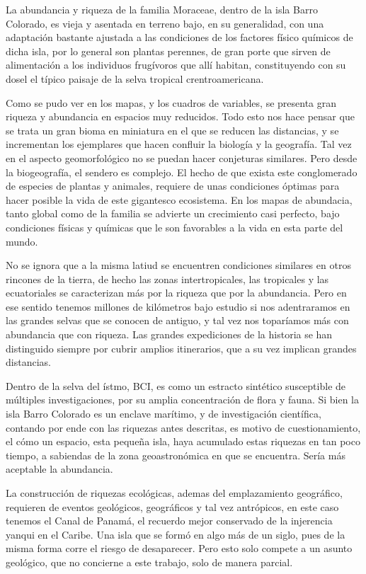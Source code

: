 \documentclass[11pt,]{article}
\begin{document}
La abundancia y riqueza de la familia Moraceae, dentro de la isla Barro
Colorado, es vieja y asentada en terreno bajo, en su generalidad, con
una adaptación bastante ajustada a las condiciones de los factores
físico químicos de dicha isla, por lo general son plantas perennes, de
gran porte que sirven de alimentación a los individuos frugívoros que
allí habitan, constituyendo con su dosel el típico paisaje de la selva
tropical crentroamericana.

Como se pudo ver en los mapas, y los cuadros de variables, se presenta
gran riqueza y abundancia en espacios muy reducidos. Todo esto nos hace
pensar que se trata un gran bioma en miniatura en el que se reducen las
distancias, y se incrementan los ejemplares que hacen confluir la
biología y la geografía. Tal vez en el aspecto geomorfológico no se
puedan hacer conjeturas similares. Pero desde la biogeografía, el
sendero es complejo. El hecho de que exista este conglomerado de
especies de plantas y animales, requiere de unas condiciones óptimas
para hacer posible la vida de este gigantesco ecosistema. En los mapas
de abundacia, tanto global como de la familia se advierte un crecimiento
casi perfecto, bajo condiciones físicas y químicas que le son favorables
a la vida en esta parte del mundo.

No se ignora que a la misma latiud se encuentren condiciones similares
en otros rincones de la tierra, de hecho las zonas intertropicales, las
tropicales y las ecuatoriales se caracterizan más por la riqueza que por
la abundancia. Pero en ese sentido tenemos millones de kilómetros bajo
estudio si nos adentraramos en las grandes selvas que se conocen de
antiguo, y tal vez nos toparíamos más con abundancia que con riqueza.
Las grandes expediciones de la historia se han distinguido siempre por
cubrir amplios itinerarios, que a su vez implican grandes distancias.

Dentro de la selva del ístmo, BCI, es como un estracto sintético
susceptible de múltiples investigaciones, por su amplia concentración de
flora y fauna. Si bien la isla Barro Colorado es un enclave marítimo, y
de investigación científica, contando por ende con las riquezas antes
descritas, es motivo de cuestionamiento, el cómo un espacio, esta
pequeña isla, haya acumulado estas riquezas en tan poco tiempo, a
sabiendas de la zona geoastronómica en que se encuentra. Sería más
aceptable la abundancia.

La construcción de riquezas ecológicas, ademas del emplazamiento
geográfico, requieren de eventos geológicos, geográficos y tal vez
antrópicos, en este caso tenemos el Canal de Panamá, el recuerdo mejor
conservado de la injerencia yanqui en el Caribe. Una isla que se formó
en algo más de un siglo, pues de la misma forma corre el riesgo de
desaparecer. Pero esto solo compete a un asunto geológico, que no
concierne a este trabajo, solo de manera parcial.
\end{document}
